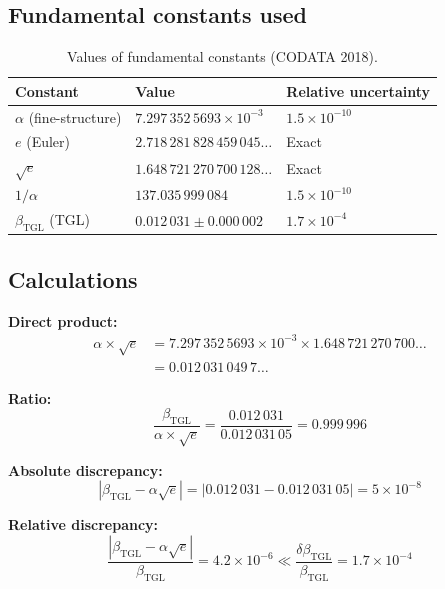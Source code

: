 \documentclass[12pt,a4paper,twoside]{article}
\newcommand{\betatgl}{\beta_{\!\scriptscriptstyle\mathrm{TGL}}}
\begin{document}
\subsection{Fundamental constants used}

\begin{table}[H]
\centering
\caption{Values of fundamental constants (CODATA 2018).}
\label{tab:constantes}
\begin{tabular}{lll}
\toprule
\textbf{Constant} & \textbf{Value} & \textbf{Relative uncertainty} \\
\midrule
$\alpha$ (fine-structure) & $7.297\,352\,5693 \times 10^{-3}$ & $1.5 \times 10^{-10}$ \\
$e$ (Euler) & $2.718\,281\,828\,459\,045\ldots$ & Exact \\
$\sqrt{e}$ & $1.648\,721\,270\,700\,128\ldots$ & Exact \\
$1/\alpha$ & $137.035\,999\,084$ & $1.5 \times 10^{-10}$ \\
$\betatgl$ (TGL) & $0.012\,031 \pm 0.000\,002$ & $1.7 \times 10^{-4}$ \\
\bottomrule
\end{tabular}
\end{table}

\subsection{Calculations}

\textbf{Direct product:}
\begin{align}
\alpha \times \sqrt{e} &= 7.297\,352\,5693 \times 10^{-3} \times 1.648\,721\,270\,700\ldots \nonumber \\
&= 0.012\,031\,049\,7\ldots
\end{align}

\textbf{Ratio:}
\begin{equation}
\frac{\betatgl}{\alpha \times \sqrt{e}} = \frac{0.012\,031}{0.012\,031\,05} = 0.999\,996
\end{equation}

\textbf{Absolute discrepancy:}
\begin{equation}
|\betatgl - \alpha\sqrt{e}| = |0.012\,031 - 0.012\,031\,05| = 5 \times 10^{-8}
\end{equation}

\textbf{Relative discrepancy:}
\begin{equation}
\frac{|\betatgl - \alpha\sqrt{e}|}{\betatgl} = 4.2 \times 10^{-6} \ll \frac{\delta\betatgl}{\betatgl} = 1.7 \times 10^{-4}
\end{equation}
\end{document}
